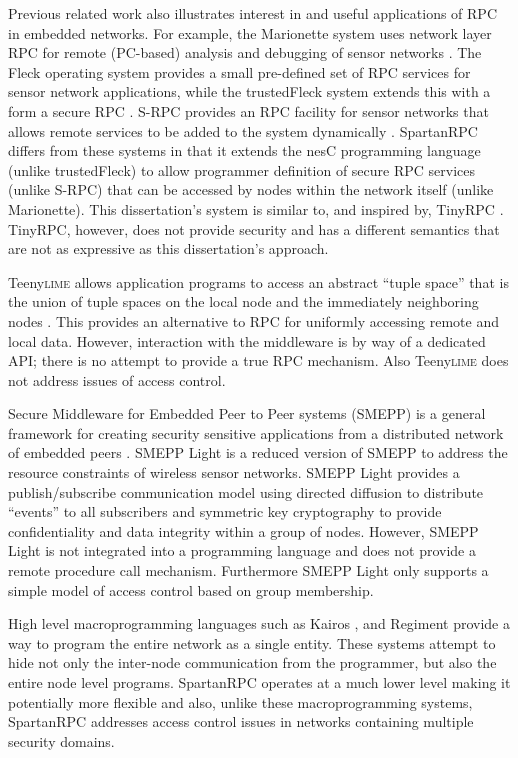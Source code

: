 Previous related work also illustrates interest in and useful applications of RPC in embedded
networks. For example, the Marionette system uses network layer RPC for remote (PC-based)
analysis and debugging of sensor networks \cite{whitehouse-marionette-2006}. The Fleck operating
system provides a small pre-defined set of RPC services for sensor network applications, while
the trustedFleck system extends this with a form a secure RPC
\cite{hu-secfleck-2009,Hu:2010:TTW:1806895.1806900}. S-RPC provides an RPC facility for sensor
networks that allows remote services to be added to the system dynamically \cite{5766863}.
SpartanRPC differs from these systems in that it extends the nesC programming language (unlike
trustedFleck) to allow programmer definition of secure RPC services (unlike S-RPC) that can be
accessed by nodes within the network itself (unlike Marionette). This dissertation's system is
similar to, and inspired by, TinyRPC \cite{may-tinyrpc-2007}. TinyRPC, however, does not provide
security and has a  different semantics that are not as
expressive as this dissertation's approach.

Teeny\textsc{lime} allows application programs to access an abstract ``tuple space'' that is the
union of tuple spaces on the local node and the immediately neighboring nodes
\cite{Costa:2007:PWS:1516124.1516153}. This provides an alternative to RPC for uniformly
accessing remote and local data. However, interaction with the middleware is by way of a
dedicated API; there is no attempt to provide a true RPC mechanism. Also Teeny\textsc{lime} does
not address issues of access control.

Secure Middleware for Embedded Peer to Peer systems (SMEPP) is a general framework for creating
security sensitive applications from a distributed network of embedded peers
\cite{Brogi:2008:SME:1363370.1363548}. SMEPP Light \cite{Vairo:2008:SMW:1594978.1595054} is a
reduced version of SMEPP to address the resource constraints of wireless sensor networks. SMEPP
Light provides a publish/subscribe communication model using directed diffusion
\cite{intanagonwiwat-2003} to distribute ``events'' to all subscribers and symmetric key
cryptography to provide confidentiality and data integrity within a group of nodes. However,
SMEPP Light is not integrated into a programming language and does not provide a remote
procedure call mechanism. Furthermore SMEPP Light only supports a simple model of access control
based on group membership.

High level macro\-programming languages such as Kairos \cite{springerlink:10.1007/1150259312},
and Regiment \cite{Newton:2007:RMS:1236360.1236422} provide a way to program the entire network
as a single entity. These systems attempt to hide not only the inter-node communication from the
programmer, but also the entire node level programs. SpartanRPC operates at a much lower level
making it potentially more flexible and also, unlike these macro\-programming systems,
SpartanRPC addresses access control issues in networks containing multiple security domains.

